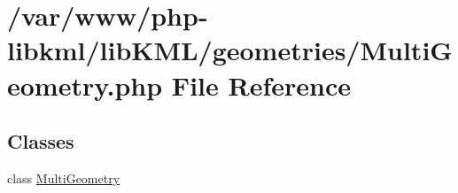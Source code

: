 \hypertarget{MultiGeometry_8php}{
\section{/var/www/php-\/libkml/libKML/geometries/MultiGeometry.php File Reference}
\label{db/d6e/MultiGeometry_8php}
}
\subsection*{Classes}
\begin{DoxyCompactItemize}
\item 
class \hyperlink{classMultiGeometry}{MultiGeometry}
\end{DoxyCompactItemize}
